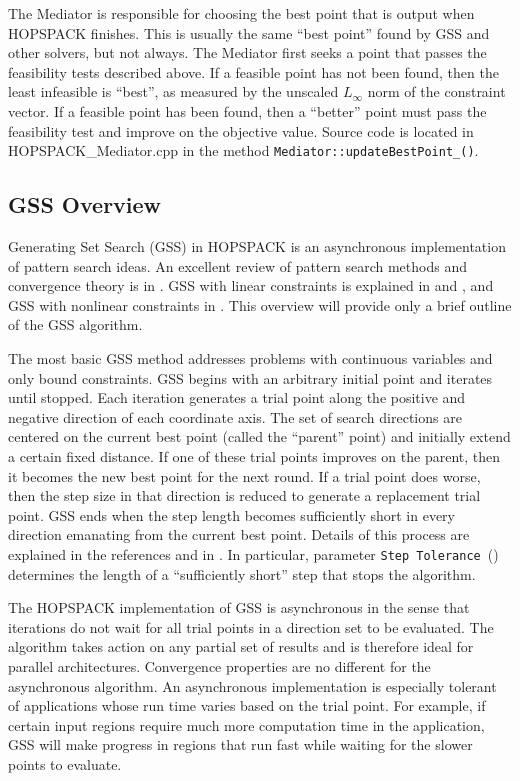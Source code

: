 The Mediator is responsible for choosing the best point that is output when
HOPSPACK finishes.  This is usually the same ``best point'' found by GSS
and other solvers, but not always.  The Mediator first seeks a point that
passes the feasibility tests described above.  If a feasible point has not
been found, then the least infeasible is ``best'', as measured by the
unscaled $L_{\infty}$ norm of the constraint vector.  If a feasible point has
been found, then a ``better'' point must pass the feasibility test and improve
on the objective value.
Source code is located in {\sf HOPSPACK\_Mediator.cpp} in the method
{\tt Mediator::updateBestPoint\_()}.



\subsection{GSS Overview}
\label{subgss}

Generating Set Search (GSS) in HOPSPACK is an asynchronous implementation
of pattern search ideas.  An excellent review of pattern search methods
and convergence theory is in \cite{SIAMRev-KoLeTo03}.
GSS with linear constraints is explained in \cite{GSS-GrKoLe08} and
\cite{GSS-KoLeTo06},
and GSS with nonlinear constraints in \cite{GSS-GrKoSAND07}.
This overview will provide only a brief outline of the GSS algorithm.

The most basic GSS method addresses problems with continuous variables and
only bound constraints.  GSS begins with an arbitrary initial point and
iterates until stopped.  Each iteration generates a trial point along the
positive and negative direction of each coordinate axis.  The set of search
directions are centered on the current best point (called the ``parent'' point)
and initially extend a certain fixed distance.
If one of these trial points improves
on the parent, then it becomes the new best point for the next round.
If a trial point does worse, then the step size in that direction is reduced
to generate a replacement trial point.  GSS ends when the step length becomes
sufficiently short in every direction emanating from the current best point.
Details of this process are explained in the references and in
.  In particular, parameter
{\tt Step Tolerance}~() determines the length of
a ``sufficiently short'' step that stops the algorithm.

The HOPSPACK implementation of GSS is asynchronous in the sense that iterations
do not wait for all trial points in a direction set to be evaluated.  The
algorithm takes action on any partial set of results and is therefore ideal
for parallel architectures.  Convergence properties are no different for the
asynchronous algorithm.  An asynchronous implementation is especially tolerant
of applications whose run time varies based on the trial point.  For example,
if certain input regions require much more computation time in the application,
GSS will make progress in regions that run fast while waiting for the slower
points to evaluate.

